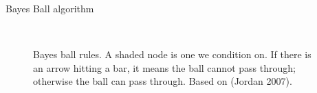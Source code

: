 \documentclass[10pt,mathserif]{beamer}
\begin{document}
\begin{frame}{Bayes Ball algorithm}
\begin{figure}[h]
\centering     %
{}
\\
\caption{Bayes ball rules. A shaded node is one we condition on. If there is an arrow hitting a bar, it means the ball cannot pass through; otherwise the ball can pass through. Based on (Jordan 2007).}
\end{figure}  
\end{frame}
\end{document}

